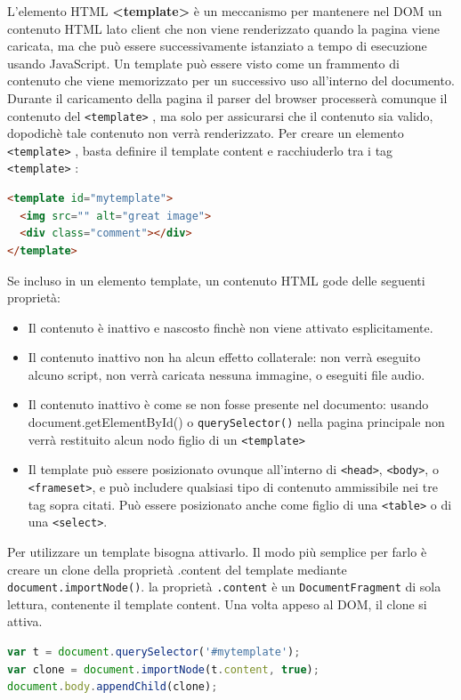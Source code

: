 L’elemento HTML \textbf{<template>} è un meccanismo per mantenere nel DOM un contenuto HTML lato client che non viene renderizzato quando la pagina viene caricata, ma che può essere successivamente istanziato a tempo di esecuzione usando JavaScript. Un template può essere visto come un frammento di contenuto che viene memorizzato per un successivo uso all’interno del documento. Durante il caricamento della pagina il parser del browser processerà comunque il contenuto del \texttt{<template>} , ma solo per assicurarsi che il contenuto sia valido, dopodichè tale contenuto non verrà renderizzato.
Per creare un elemento \texttt{<template>} , basta definire il template content e racchiuderlo tra i tag \texttt{<template>} :
\begin{lstlisting}[language=html]
<template id="mytemplate">
  <img src="" alt="great image">
  <div class="comment"></div>
</template>
\end{lstlisting}
Se incluso in un elemento template, un contenuto HTML gode delle seguenti proprietà: 
\begin{itemize}
\item Il contenuto è inattivo e nascosto finchè non viene attivato esplicitamente.
\item Il contenuto inattivo non ha alcun effetto collaterale: non verrà eseguito alcuno script, non verrà caricata nessuna immagine, o eseguiti file audio.
\item Il contenuto inattivo è come se non fosse presente nel documento: usando document.getElementById() o \texttt{querySelector()} nella pagina principale non verrà restituito alcun nodo figlio di un \texttt{<template>}
\item Il template può essere posizionato ovunque all’interno di \texttt{<head>}, \texttt{<body>}, o \texttt{<frameset>}, e può includere qualsiasi tipo di contenuto ammissibile nei tre tag sopra citati. Può essere posizionato anche come figlio di una \texttt{<table>} o di una \texttt{<select>}. 
\end{itemize}
Per utilizzare un template bisogna attivarlo. Il modo più semplice per farlo è creare un clone della proprietà .content del template mediante \texttt{document.importNode()}. la proprietà \texttt{.content} è un \texttt{DocumentFragment} di sola lettura, contenente il template content. Una volta appeso al DOM, il clone si attiva.
\begin{lstlisting}[language=javascript]
var t = document.querySelector('#mytemplate');
var clone = document.importNode(t.content, true);
document.body.appendChild(clone);
\end{lstlisting}

